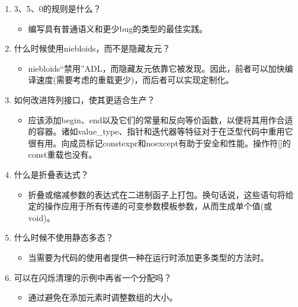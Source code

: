 \begin{enumerate}
\item
3、5、0的规则是什么？
\begin{itemize}
\item 
编写具有普通语义和更少bug的类型的最佳实践。
\end{itemize}

\item
什么时候使用niebloids，而不是隐藏友元？
\begin{itemize}
\item 
niebloids“禁用”ADL，而隐藏友元依靠它被发现。因此，前者可以加快编译速度(需要考虑的重载更少)，而后者可以实现定制化。
\end{itemize}

\item
如何改进阵列接口，使其更适合生产？
\begin{itemize}
\item 
应该添加begin、end以及它们的常量和反向等价函数，以便将其用作合适的容器。诸如value\_type、指针和迭代器等特征对于在泛型代码中重用它很有用。向成员标记constexpr和noexcept有助于安全和性能。操作符[]的const重载也没有。
\end{itemize}

\item
什么是折叠表达式？
\begin{itemize}
\item 
折叠或缩减参数的表达式在二进制函子上打包。换句话说，这些语句将给定的操作应用于所有传递的可变参数模板参数，从而生成单个值(或void)。
\end{itemize}

\item
什么时候不使用静态多态？
\begin{itemize}
\item 
当需要为代码的使用者提供一种在运行时添加更多类型的方法时。
\end{itemize}

\item
可以在闪烁清理的示例中再省一个分配吗？
\begin{itemize}
\item 
通过避免在添加元素时调整数组的大小。
\end{itemize}
\end{enumerate}